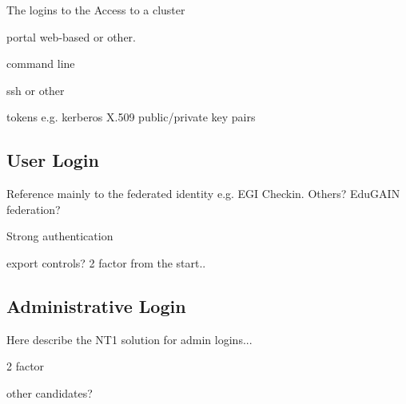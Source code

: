 \documentclass[12pt,a4paper]{article}
\begin{document}
The logins to the \ED 
Access to a cluster

portal web-based or other.

command line 

ssh or other

tokens e.g. kerberos X.509 public/private key pairs


\subsection{User Login}

Reference mainly to the federated identity e.g. EGI Checkin. Others? EduGAIN federation?

Strong authentication

export controls? 2 factor from the start..


\subsection{Administrative Login}

Here describe the NT1 solution for admin logins...

2 factor

other candidates?


\newpage
{}

\end{document}
